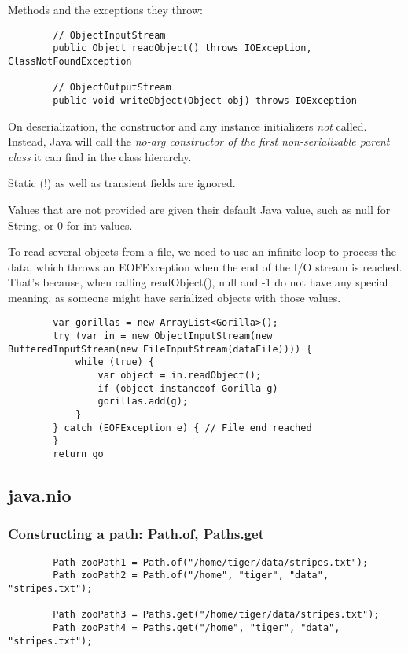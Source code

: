 \documentclass{scrartcl}
\begin{document}
    Methods and the exceptions they throw:

    \begin{lstlisting}
        // ObjectInputStream
        public Object readObject() throws IOException, ClassNotFoundException

        // ObjectOutputStream
        public void writeObject(Object obj) throws IOException
    \end{lstlisting}

    On deserialization, the constructor and any instance initializers \textit{not} called.
    Instead, Java will call the \textit{no-­arg constructor of the first non-serializable parent class} it can find in the class hierarchy.

    Static (!) as well as transient fields are ignored.

    Values that are not provided are  given their default Java value, such as null for String, or 0 for int values.

    To read several objects from a file, we need to use an infinite loop to process the data,
    which throws an EOFException when the end of the I/O stream is reached. That's because, when calling readObject(), null and -­1 do not have any special meaning,
    as someone might have serialized objects with those values.

    \begin{lstlisting}
        var gorillas = new ArrayList<Gorilla>();
        try (var in = new ObjectInputStream(new BufferedInputStream(new FileInputStream(dataFile)))) {
            while (true) {
                var object = in.readObject();
                if (object instanceof Gorilla g)
                gorillas.add(g);
            }
        } catch (EOFException e) { // File end reached
        }
        return go
    \end{lstlisting}

\subsection{java.nio}

\subsubsection{Constructing a path: Path.of, Paths.get}

    \begin{lstlisting}
        Path zooPath1 = Path.of("/home/tiger/data/stripes.txt");
        Path zooPath2 = Path.of("/home", "tiger", "data", "stripes.txt");

        Path zooPath3 = Paths.get("/home/tiger/data/stripes.txt");
        Path zooPath4 = Paths.get("/home", "tiger", "data", "stripes.txt");
    \end{lstlisting}
\end{document}
